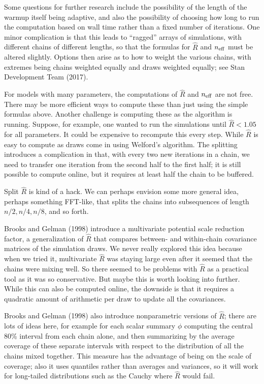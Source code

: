 \documentclass[11pt]{article}
\begin{document}
Some questions for further research include the possibility of the length of the warmup itself being adaptive, and also the possibility of choosing how long to run the computation based on wall time rather than a fixed number of iterations.  One minor complication is that this leads to ``ragged'' arrays of simulations, with different chains of different lengths, so that the formulas for $\widehat{R}$ and $n_{\rm eff}$ must be altered slightly.  Options then arise as to how to weight the various chains, with extremes being chains weighted equally and draws weighted equally; see Stan Development Team (2017).




For models with many parameters, the computations of $\widehat{R}$ and $n_{\rm eff}$ are not free.  There may be more efficient ways to compute these than just using the simple formulas above.  Another challenge is computing these as the algorithm is running.  Suppose, for example, one wanted to run the simulations until $\widehat{R}<1.05$ for all parameters.  It could be expensive to recompute this every step.  While $\widehat{R}$ is easy to compute as draws come in using Welford's algorithm.  The splitting introduces a complication in that, with every two new iterations in a chain, we need to transfer one iteration from the second half to the first half;  it is still possible to compute online, but it requires at least half the chain to be buffered.

Split $\widehat{R}$ is kind of a hack.  We can perhaps envision some more general idea, perhaps something FFT-like, that splits the chains into subsequences of length $n/2, n/4, n/8$, and so forth.

Brooks and Gelman (1998) introduce a multivariate potential scale reduction factor, a generalization of $\widehat{R}$ that compares between- and within-chain covariance matrices of the simulation draws.  We never really explored this idea because when we tried it, multivariate $\widehat{R}$ was staying large even after it seemed that the chains were mixing well.  So there seemed to be problems with $\widehat{R}$ as a practical tool as it was so conservative.  But maybe this is worth looking into further.  While this can also be computed online, the downside is that it requires a quadratic amount of arithmetic per draw to update all the covariances.

Brooks and Gelman (1998) also introduce nonparametric versions of $\widehat{R}$; there are lots of ideas here, for example for each scalar summary $\phi$ computing the central 80\% interval from each chain alone, and then summarizing by the average coverage of these separate intervals with respect to the distribution of all the chains mixed together.  This measure has the advantage of being on the scale of coverage; also it uses quantiles rather than averages and variances, so it will work for long-tailed distributions such as the Cauchy where $\widehat{R}$ would fail.
\end{document}
